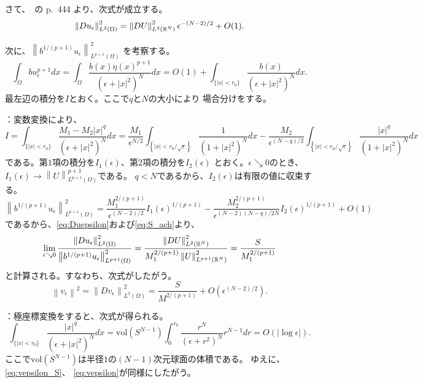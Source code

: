 さて、\cite{MR709644}~の p.~444 より、次式が成立する。
\begin{equation}
 \left\| Du_\epsilon \right\|_{L^2(\Omega)}^2 
  = \left\| DU \right\|_{L^2(\mathbb{R}^N)}^2 \epsilon^{-(N-2)/2} + O(1).
  \label{eq:Duepsilon}
\end{equation}

次に、$\left\| b^{1/(p+1)} u_\epsilon \right\|_{L^{p+1}(\Omega)}^2$
を考察する。
\[
 \int_\Omega b u_{\epsilon}^{p+1} dx
 = \int_\Omega \frac{b(x) \eta(x)^{p+1}}{(\epsilon + \lvert x
 \rvert^2)^N} dx 
 = O(1) + \int_{ \{ \lvert x \rvert < r_0 \} } 
 \frac{b(x)}{(\epsilon + \lvert x
 \rvert^2)^N} dx.
\]
最左辺の積分を$I$とおく。ここで$q$と$N$の大小により
場合分けをする。

：変数変換により、
\[
 I = \int_{ \{ \lvert x \rvert < r_0 \} } 
 \frac{M_1 - M_2 \lvert x \rvert^q}{(\epsilon + \lvert x
 \rvert^2)^N} dx
 = \frac{M_1}{\epsilon^{N/2}} \int_{ \left\{ \lvert x \rvert <
 r_0/\sqrt{\epsilon} \right\}} \frac{1}{(1 + \lvert x
 \rvert^2)^N}dx
 - \frac{M_2}{\epsilon^{(N-q)/2}} \int_{ \left\{ \lvert x \rvert <
 r_0/\sqrt{\epsilon} \right\}}
 \frac{ \lvert x \rvert^q}{(1 + \lvert x
 \rvert^2)^N}dx
\]
である。第$1$項の積分を$I_1(\epsilon)$、第$2$項の積分を$I_2(\epsilon)$
とおく。$\epsilon \searrow 0$のとき、
$I_1(\epsilon) \to \left\| U \right\|_{L^{p+1}(\Omega)}^{p+1}$である。
$q < N$であるから、$I_2(\epsilon)$は有限の値に収束する。
\[
 \left\| b^{1/(p+1)} u_\epsilon \right\|_{L^{p+1}(\Omega)}^2 = 
 \frac{M_1^{2/(p+1)}}{\epsilon^{(N-2)/2}} I_1(\epsilon)^{1/(p+1)} 
 - \frac{M_2^{2/(p+1)}}{\epsilon^{(N-2)(N-q)/2N}}
 I_2(\epsilon)^{1/(p+1)} + O(1)
\]
であるから、\eqref{eq:Duepsilon}および\eqref{eq:S_ach}より、
\begin{equation}
 \lim_{\epsilon \searrow 0} 
  \frac{\left\| Du_\epsilon
        \right\|_{L^2(\Omega)}^2}
  {\left\| b^{1/(p+1)} u_\epsilon \right\|_{L^{p+1}(\Omega)}^2}
  = \frac{\left\| DU \right\|_{L^2(\mathbb{R}^N)}^2}{M_1^{2/(p+1)} 
  \left\| U \right\|_{L^{p+1}(\mathbb{R}^N)}^2} = \frac{S}{M_1^{2/(p+1)}}
  \label{eq:vepsilon_S}
\end{equation}
と計算される。すなわち、次式がしたがう。
\begin{equation}
 \left\| v_\epsilon \right\|^2 = \left\| Dv_\epsilon
                                 \right\|^2_{L^2(\Omega)} 
 = \frac{S}{M^{2/(p+1)}} + O(\epsilon^{(N-2)/2}). \label{eq:vepsilon}
\end{equation}

：極座標変換をすると、次式が得られる。
\[
 \int_{ \{ \lvert x \rvert < r_0 \} } 
 \frac{\lvert x \rvert^q}{(\epsilon + \lvert x
 \rvert^2)^N} dx
 = \mathrm{vol}(S^{N-1}) \int_0^{r_0} \frac{r^N}{(\epsilon + r^2)^N}
 r^{N-1} dr = O(\lvert \log \epsilon \rvert).
\]
ここで$\mathrm{vol}(S^{N-1})$は半径$1$の$(N-1)$次元球面の体積である。
ゆえに、
\eqref{eq:vepsilon_S}、
\eqref{eq:vepsilon}が同様にしたがう。

